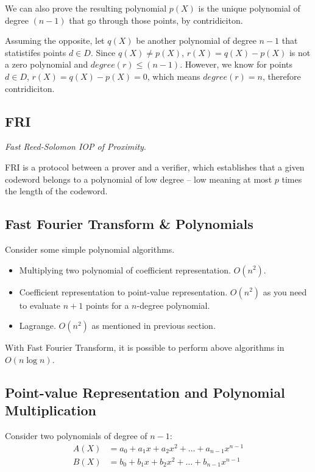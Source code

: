 \documentclass[10pt]{article}
\begin{document}
We can also prove the resulting polynomial $p(X)$ is the unique polynomial of
degree $(n-1)$ that go through those points, by contridiciton.

Assuming the opposite, let $q(X)$ be another polynomial of degree $n-1$ that
statistifes points $d \in D$. Since $q(X) \neq p(X)$, $r(X) = q(X) - p(X)$ is
not a zero polynomial and $degree(r) \leq (n-1)$. However, we know for
points $d \in D$, $r(X) = q(X) - p(X) = 0$, which means $degree(r) = n$,
therefore contridiciton.

\subsection{FRI}
\emph{Fast Reed-Solomon IOP of Proximity}.

FRI is a protocol between a prover and a verifier, which establishes that a
given codeword belongs to a polynomial of low degree – low meaning at most $p$
times the length of the codeword. 

\subsection{Fast Fourier Transform \& Polynomials}
Consider some simple polynomial algorithms.
\begin{itemize}
    \item Multiplying two polynomial of coefficient representation. $O(n^2)$.
    \item Coefficient representation to point-value representation. $O(n^2)$ as
        you need to evaluate $n+1$ points for a $n$-degree polynomial.
    \item Lagrange. $O(n^2)$ as mentioned in previous section.
\end{itemize}

With Fast Fourier Transform, it is possible to perform above
algorithms in $O(n\log n)$.

\subsection{Point-value Representation and Polynomial Multiplication}
Consider two polynomials of degree of $n-1$:
\[
\begin{aligned}
    A(X) &= a_0 + a_1x + a_2x^2 + \ldots + a_{n-1}x^{n-1} \\
    B(X) &= b_0 + b_1x + b_2x^2 + \ldots + b_{n-1}x^{n-1} \\
\end{aligned}
\]
\end{document}
